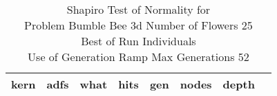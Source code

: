 \begin{table}[H]
\caption{Shapiro Test of Normality for \\ Problem  Bumble Bee 3d  Number of Flowers 25\\Best of Run Individuals \\ Use of Generation Ramp  Max Generations 52\\}
\begin{center}
\scalebox{0.8} %
{
\begin{tabular}{lrrrrrrr}
\hline
kern & adfs & what & hits & gen & nodes & depth \\
\hline


\end{tabular}
}
\end{center}
\end{table}

